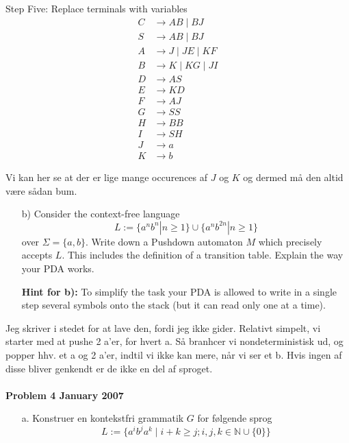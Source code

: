 Step Five: Replace terminals with variables
\begin{align*}
C &\to AB \mid BJ \\
S &\to AB \mid BJ \\
A &\to J \mid JE \mid KF \\
B &\to K \mid KG \mid JI \\
D &\to AS \\
E &\to KD \\
F &\to AJ \\
G &\to SS \\
H &\to BB \\
I &\to SH \\
J &\to a \\
K &\to b
\end{align*}

Vi kan her se at der er lige mange occurences af $J$ og $K$ og dermed må den altid være sådan bum.

\begin{enumerate}
    \item[b)] Consider the context-free language
    \[
    L := \{a^n b^n | n \geq 1\} \cup \{a^n b^{2n} | n \geq 1\}
    \]
    over \( \Sigma = \{a, b\} \).
    Write down a Pushdown automaton \( M \) which precisely accepts \( L \). This includes the definition of a transition table. Explain the way your PDA works.

    \textbf{Hint for b):} To simplify the task your PDA is allowed to write in a single step several symbols onto the stack (but it can read only one at a time).
\end{enumerate}

Jeg skriver i stedet for at lave den, fordi jeg ikke gider. Relativt simpelt, vi starter med at pushe 2 a'er, for hvert a. Så branhcer vi nondeterministisk ud, og popper hhv. et a og 2 a'er, indtil vi ikke kan mere, når vi ser et b. Hvis ingen af disse bliver genkendt er de ikke en del af sproget.\\\\

\noindent
{\Large \textbf{Problem 4 January 2007}}\\
\noindent

\begin{enumerate}
  \item[a.] Konstruer en kontekstfri grammatik $G$ for følgende sprog
        \[L := \{a^{i}b^{j}a^{k} \mid i+k \ge j; i,j,k \in \mathbb{N} \cup \{0\}\}\]
\end{enumerate}

